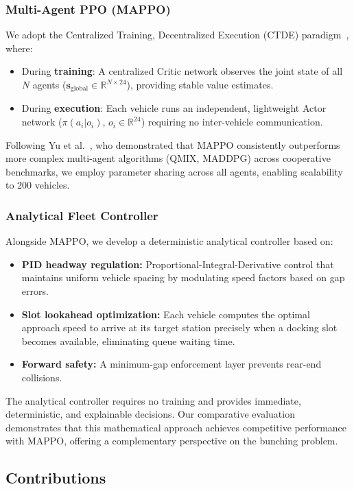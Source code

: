 \subsubsection{Multi-Agent PPO (MAPPO)}
We adopt the Centralized Training, Decentralized Execution (CTDE) paradigm~\cite{lowe2017multi}, where:
\begin{itemize}
    \item During \textbf{training}: A centralized Critic network observes the joint state of all $N$ agents ($\mathbf{s}_{\text{global}} \in \mathbb{R}^{N \times 24}$), providing stable value estimates.
    \item During \textbf{execution}: Each vehicle runs an independent, lightweight Actor network ($\pi(a_i | o_i)$, $o_i \in \mathbb{R}^{24}$) requiring no inter-vehicle communication.
\end{itemize}

Following Yu et al.~\cite{yu2022surprising}, who demonstrated that MAPPO consistently outperforms more complex multi-agent algorithms (QMIX, MADDPG) across cooperative benchmarks, we employ parameter sharing across all agents, enabling scalability to 200 vehicles.

\subsubsection{Analytical Fleet Controller}
Alongside MAPPO, we develop a deterministic analytical controller based on:
\begin{itemize}
    \item \textbf{PID headway regulation:} Proportional-Integral-Derivative control that maintains uniform vehicle spacing by modulating speed factors based on gap errors.
    \item \textbf{Slot lookahead optimization:} Each vehicle computes the optimal approach speed to arrive at its target station precisely when a docking slot becomes available, eliminating queue waiting time.
    \item \textbf{Forward safety:} A minimum-gap enforcement layer prevents rear-end collisions.
\end{itemize}

The analytical controller requires no training and provides immediate, deterministic, and explainable decisions. Our comparative evaluation demonstrates that this mathematical approach achieves competitive performance with MAPPO, offering a complementary perspective on the bunching problem.

\subsection{Contributions}

